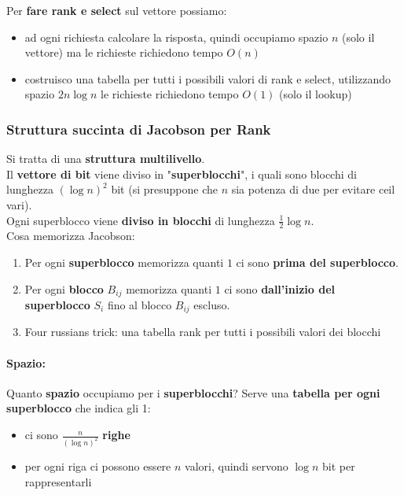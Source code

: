 Per \textbf{fare rank e select} sul vettore possiamo: 
\begin{itemize}
	\item ad ogni richiesta calcolare la risposta, quindi occupiamo spazio $n$ (solo il vettore) ma le richieste richiedono tempo $O(n)$
	\item costruisco una tabella per tutti i possibili valori di rank e select, utilizzando spazio $2n \log n$ le richieste richiedono tempo $O(1)$ (solo il lookup)
\end{itemize}
 
\newpage

\subsubsection{Struttura succinta di Jacobson per Rank}

Si tratta di una \textbf{struttura multilivello}. \\

Il \textbf{vettore di bit} viene diviso in "\textbf{superblocchi}", i quali sono blocchi di lunghezza $(\log n)^2$ bit (si presuppone che $n$ sia potenza di due per evitare ceil vari).\\

Ogni superblocco viene \textbf{diviso in blocchi} di lunghezza $\frac{1}{2} \log n$.\\

Cosa memorizza Jacobson: 
\begin{enumerate}
	\item Per ogni \textbf{superblocco} memorizza quanti $1$ ci sono \textbf{prima del superblocco}.\\
	
	\item Per ogni \textbf{blocco} $B_{ij}$ memorizza quanti $1$ ci sono \textbf{dall'inizio del superblocco} $S_i$ fino al blocco $B_{ij}$ escluso.\\
	
	\item Four russians trick: una tabella rank per tutti i possibili valori dei blocchi
\end{enumerate}

\paragraph{Spazio:} Quanto \textbf{spazio} occupiamo per i \textbf{superblocchi}? Serve una \textbf{tabella per ogni superblocco} che indica gli 1:
\begin{itemize}
	\item ci sono $\frac{n}{(\log n)^2}$ \textbf{righe}
	\item per ogni riga ci possono essere $n$ valori, quindi servono $\log n$ bit per rappresentarli
\end{itemize}

